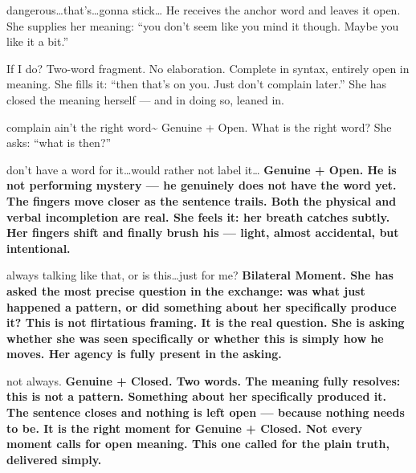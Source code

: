 \thinrule

{dangerous\ldots that's\ldots gonna stick\ldots}
{He receives the anchor word and leaves it open. She supplies her meaning: ``you don't seem like you mind it though. Maybe you like it a bit.''}

{If I do?}
{Two-word fragment. No elaboration. Complete in syntax, entirely open in meaning. She fills it: ``then that's on you. Just don't complain later.'' She has closed the meaning herself --- and in doing so, leaned in.}

{complain ain't the right word\textasciitilde}
{Genuine + Open. What is the right word? She asks: ``what is then?''}

{don't have a word for it\ldots would rather not label it\ldots}
{\textbf{Genuine + Open. He is not performing mystery --- he genuinely does not have the word yet. The fingers move closer as the sentence trails. Both the physical and verbal incompletion are real. She feels it: her breath catches subtly. Her fingers shift and finally brush his --- light, almost accidental, but intentional.}}

{always talking like that, or is this\ldots just for me?}
{\textbf{Bilateral Moment. She has asked the most precise question in the exchange: was what just happened a pattern, or did something about her specifically produce it? This is not flirtatious framing. It is the real question. She is asking whether she was seen specifically or whether this is simply how he moves. Her agency is fully present in the asking.}}

{not always.}
{\textbf{Genuine + Closed. Two words. The meaning fully resolves: this is not a pattern. Something about her specifically produced it. The sentence closes and nothing is left open --- because nothing needs to be. It is the right moment for Genuine + Closed. Not every moment calls for open meaning. This one called for the plain truth, delivered simply.}}

\goldrule

